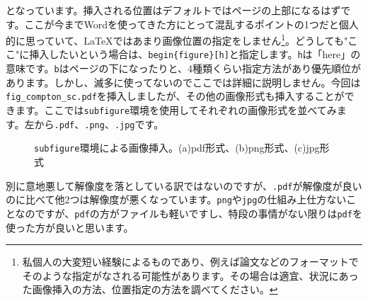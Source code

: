 \documentclass[a4paper,papersize,uplatex,dvipdfmx,10pt]{jsarticle}
\newcommand{\bs}{\symbol{92}} %
\begin{document}
となっています。挿入される位置はデフォルトではページの上部になるはずです。ここが今までWordを使ってきた方にとって混乱するポイントの1つだと個人的に思っていて、\LaTeX{}ではあまり画像位置の指定をしません\footnote{私個人の大変短い経験によるものであり、例えば論文などのフォーマットでそのような指定がなされる可能性があります。その場合は適宜、状況にあった画像挿入の方法、位置指定の方法を調べてください。}。どうしても"ここ"に挿入したいという場合は、\texttt{\bs begin\{figure\}[h]}と指定します。\texttt{h}は「here」の意味です。\texttt{b}はページの下になったりと、4種類くらい指定方法があり優先順位があります。しかし、滅多に使ってないのでここでは詳細に説明しません。今回は\texttt{fig\_compton\_sc.pdf}を挿入しましたが、その他の画像形式も挿入することができます。ここでは\texttt{subfigure}環境を使用してそれぞれの画像形式を並べてみます。左から\texttt{.pdf}、\texttt{.png}、\texttt{.jpg}です。
\begin{figure}
  \centering
  \caption[\texttt{subfigure}環境による画像挿入]{\texttt{subfigure}環境による画像挿入。(a)pdf形式、(b)png形式、(c)jpg形式}
  \label{fig:compton_sc_sb}
\end{figure}
別に意地悪して解像度を落としている訳ではないのですが、\texttt{.pdf}が解像度が良いのに比べて他2つは解像度が悪くなっています。\texttt{png}や\texttt{jpg}の仕組み上仕方ないことなのですが、\texttt{pdf}の方がファイルも軽いですし、特段の事情がない限りは\texttt{pdf}を使った方が良いと思います。
\end{document}
